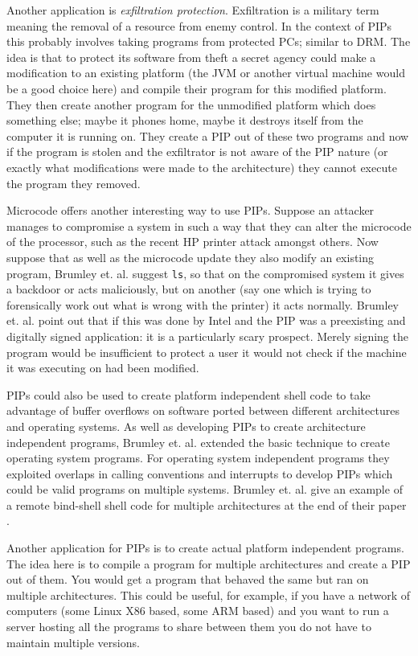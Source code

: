 \documentclass[10pt]{book}
\begin{document}
Another application is \emph{exfiltration protection}. Exfiltration is a
military term meaning the removal of a resource from enemy control. In
the context of PIPs this probably involves taking programs from
protected PCs; similar to DRM. The idea is that to protect its software
from theft a secret agency could make a modification to an existing
platform (the JVM or another virtual machine would be a good choice
here) and compile their program for this modified platform. They then
create another program for the unmodified platform which does something
else; maybe it phones home, maybe it destroys itself from the computer
it is running on. They create a PIP out of these two programs and now if
the program is stolen and the exfiltrator is not aware of the PIP nature
(or exactly what modifications were made to the architecture) they
cannot execute the program they removed.

Microcode offers another interesting way to use PIPs. Suppose an
attacker manages to compromise a system in such a way that they can
alter the microcode of the processor, such as the recent HP printer
attack amongst others\autocite{Cui:vx}\autocite{Scythale:tk}. Now
suppose that as well as the microcode update they also modify an
existing program, Brumley et. al. suggest \lstinline!ls!, so that on the
compromised system it gives a backdoor or acts maliciously, but on
another (say one which is trying to forensically work out what is wrong
with the printer) it acts normally. Brumley et. al. point
out\autocite{Cha:2010uh} that if this was done by Intel and the PIP was
a preexisting and digitally signed application: it is a particularly
scary prospect. Merely signing the program would be insufficient to
protect a user it would not check if the machine it was executing on had
been modified.

PIPs could also be used to create platform independent shell code to
take advantage of buffer overflows on software ported between different
architectures and operating systems. As well as developing PIPs to
create architecture independent programs, Brumley et.
al.\autocite{Cha:2010uh} extended the basic technique to create
operating system programs. For operating system independent programs
they exploited overlaps in calling conventions and interrupts to develop
PIPs which could be valid programs on multiple systems. Brumley et. al.
give an example of a remote bind-shell shell code for multiple
architectures at the end of their paper \autocite{Cha:2010uh}.

Another application for PIPs is to create actual platform independent
programs. The idea here is to compile a program for multiple
architectures and create a PIP out of them. You would get a program that
behaved the same but ran on multiple architectures. This could be
useful, for example, if you have a network of computers (some Linux X86
based, some ARM based) and you want to run a server hosting all the
programs to share between them you do not have to maintain multiple
versions.
\end{document}
